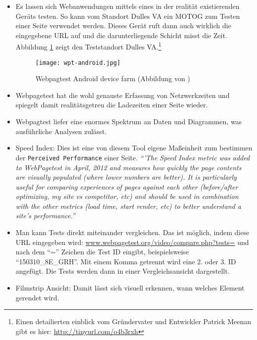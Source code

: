 			\begin{itemize}
				\item Es lassen sich Webanwendungen mittels eines in der realität existierenden Geräts testen. So kann vom Standort Dulles VA ein MOTOG zum Testen einer Seite verwendet werden. Dieses Gerät ruft dann auch wirklich die eingegebene URL auf und die darunterliegende Schicht misst die Zeit. Abbildung \ref{fig:wpt-android} zeigt den Teststandort Dulles VA.\footnote{Einen detailierten einblick vom Gründervater und Entwickler Patrick Meenan gibt es hier: \url{http://tinyurl.com/o4b3rxh}}

				\begin{figure}[htbp]
					\begin{center}
						\texttt{[image: wpt-android.jpg]}
						\caption{Webpagtest Android device farm (Abbildung von \autocite{meenan15})}
						\label{fig:wpt-android}
					\end{center}
				\end{figure}
				\item Webpagetest hat die wohl genauste Erfassung von Netzwerkzeiten und spiegelt damit realitätsgetreu die Ladezeiten einer Seite wieder.

				\item Webpagtest liefer eine enormes Spektrum an Daten und Diagrammen, was ausführliche Analysen zulässt.

				\item Speed Index: Dies ist eine von diesem Tool eigene Maßeinheit zum bestimmen der \texttt{Perceived Performance} einer Seite. \textit{"`'The Speed Index metric was added to WebPagetest in April, 2012 and measures how quickly the page contents are visually populated (where lower numbers are better).  It is particularly useful for comparing experiences of pages against each other (before/after optimizing, my site vs competitor, etc) and should be used in combination with the other metrics (load time, start render, etc) to better understand a site's performance."'}\autocite{webpagetestDocs}

				\item Man kann Tests direkt miteinander vergleichen. Das ist möglich, indem diese URL eingegeben wird: \url{www.webpagetest.org/video/compare.php?tests=} und nach dem "`="' Zeichen die Test ID eingibt, beispielsweise "`150310\_8E\_GRH"'.
				Mit einem Komma getrennt wird eine 2. oder 3. ID angefügt. Die Tests werden dann in einer Vergleichsansicht dargestellt.

				\item Filmstrip Ansicht: Damit lässt sich visuell erkennen, wann welches Element gerendet wird.


\end{itemize}
